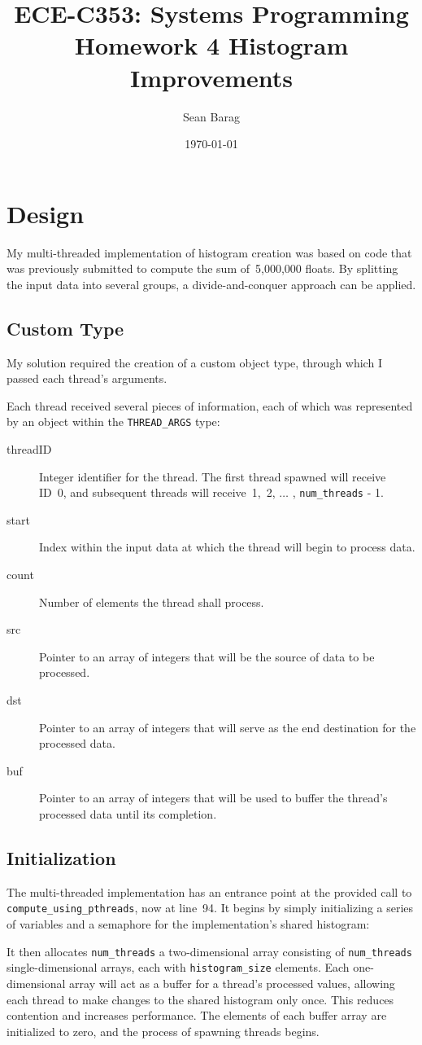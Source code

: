 \documentclass{article}
\title{ECE-C353: Systems Programming \\ Homework 4 Histogram Improvements}
\author{Sean Barag \\ \ttt{<sjb89@drexel.edu>}}
\date{\today}
\newcommand{\lst}[2]{
	\begin{center}
	\parbox{.6\textwidth}{
	}
	\end{center}
}
\newcommand{\ttt}[1]{\texttt{#1}}
\begin{document}
\maketitle
\section{Design}
My multi-threaded implementation of histogram creation was based on code that
was previously submitted to compute the sum of~5,000,000 floats.  By splitting
the input data into several groups, a divide-and-conquer approach can be
applied.

\subsection{Custom Type}
My solution required the creation of a custom object type, through which I passed each thread's arguments.
%
\lst{21}{31}
%
Each thread received several pieces of information, each of which was represented by an object within the \ttt{THREAD\_ARGS} type:

\begin{center}
\parbox{.85\textwidth}{
\begin{description}
	\item[threadID]{Integer identifier for the thread.  The first thread
	spawned will receive ID~0, and subsequent threads will
	receive~1,~2, $\ldots$ , \ttt{num\_threads} - 1.}
	\item[start]{Index within the input data at which the thread will begin to
	process data.}
	\item[count]{Number of elements the thread shall process.}
	\item[src]{Pointer to an array of integers that will be the source of data
	to be processed.}
	\item[dst]{Pointer to an array of integers that will serve as the end
	destination for the processed data.}
	\item[buf]{Pointer to an array of integers that will be used to buffer the
	thread's processed data until its completion.}
\end{description}
}
\end{center}

\subsection{Initialization}
The multi-threaded implementation has an entrance point at the provided call to
\ttt{compute\_using\_pthreads}, now at line~94.  It begins by simply
initializing a series of variables and a semaphore for the implementation's shared histogram:
%
\lst{134}{145}
%
It then allocates \ttt{num\_threads} a two-dimensional array consisting of
\ttt{num\_threads} single-dimensional arrays, each with
\ttt{histogram\_size} elements.  Each one-dimensional array will act as a
buffer for a thread's processed values, allowing each thread to make changes to
the shared histogram only once.  This reduces contention and increases
performance.  The elements of each buffer array are initialized to zero, and
the process of spawning threads begins.
%
\lst{147}{155}
\end{document}
